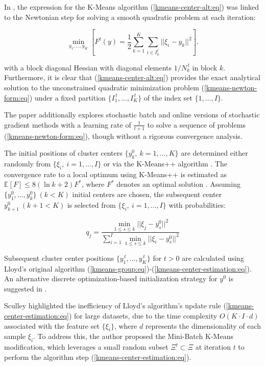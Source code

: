 In \cite{Bottou_1994}, the expression for the K-Means algorithm (\ref{kmeans-center-alt:eq}) was linked to the Newtonian step for solving a smooth quadratic problem at each iteration:

\begin{equation}
    \label{kmeans-newton-form:eq}
    \min_{y_1,\ldots,y_K}\left[F^t(y) = \frac{1}{2} \sum_{k=1}^K \sum_{i \in I_k^t} || \xi_i - y_k ||^2\right].
\end{equation}

\noindent with a block diagonal Hessian with diagonal elements $1/N_k^{\,t}$ in block $k$. Furthermore, it is clear that (\ref{kmeans-center-alt:eq}) provides the exact analytical solution to the unconstrained quadratic minimization problem (\ref{kmeans-newton-form:eq}) under a fixed partition $\{I_1^{\,t},\ldots,I_K^{\,t}\}$ of the index set $\{1,\ldots,I\}$.

The paper additionally explores stochastic batch and online versions of stochastic gradient methods with a learning rate of $\frac{1}{t + 1}$ to solve a sequence of problems (\ref{kmeans-newton-form:eq}), though without a rigorous convergence analysis.

The initial positions of cluster centers $\{ y_k^0, \> k = 1, \ldots, K \}$ are determined either randomly from $\{ \xi_i, \> i = 1, \ldots, I \}$ or via the K-Means++ algorithm \cite{Arthur_Vassilvitskii_2007,Nguyen_Duong_2018}. The convergence rate to a local optimum using K-Means++ is estimated as $\mathbb{E} [F] \leq 8(\ln k + 2 ) F^{*}$, where $F^{*}$ denotes an optimal solution \cite{Arthur_Vassilvitskii_2007}. Assuming $\{ y_1^0, \ldots, y_k^0 \} \> (k<K)$ initial centers are chosen, the subsequent center $y_{k+1}^0 \> (k+1<K)$ is selected from $\{ \xi_i, \> i = 1, \ldots, I \}$ with probabilities:

\begin{equation}
    \label{kmeans-plus-plus-init:eq}
    q_j = \frac{\min_{1 \leq s \leq k} || \xi_j - y_s^0 ||^2}{\sum_{i=1}^I \min_{1 \leq s \leq k} || \xi_i - y_s^0 ||^2}
\end{equation}

Subsequent cluster center positions $\{ y_1^{\,t}, \ldots, y_K^{\,t} \}$ for $t > 0$ are calculated using Lloyd's original algorithm (\ref{kmeans-group:eq})-(\ref{kmeans-center-estimation:eq}). An alternative discrete optimization-based initialization strategy for $y^{0}$ is suggested in \cite[Sec. 4, Stage 1]{Kuzmenko_Uryasev_2019}.

Sculley \cite{Sculley_2010} highlighted the inefficiency of Lloyd's algorithm's update rule (\ref{kmeans-center-estimation:eq}) for large datasets, due to the time complexity $O(K \cdot I \cdot d)$ associated with the feature set $\{ \xi_i \}$, where $d$ represents the dimensionality of each sample $\xi_i$. To address this, the author proposed the Mini-Batch K-Means modification, which leverages a small random subset $\Xi^{t}\subset \Xi$ at iteration $t$ to perform the algorithm step (\ref{kmeans-center-estimation:eq}).

